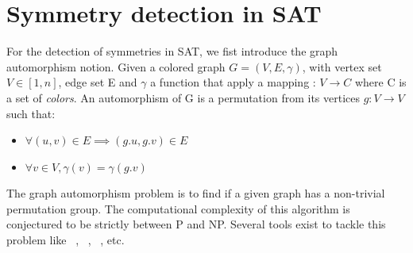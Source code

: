%
%
%
\section{Symmetry detection in SAT}
For the detection of symmetries in SAT, we fist introduce the graph automorphism notion.
Given a colored graph $G = (V, E, \gamma)$, with vertex set $V \in  [1, n] $, edge set E and
$\gamma$ a function that apply a mapping : $V \rightarrow C$ where C is a set of \emph{colors}.
An automorphism of G is a permutation from its vertices $g :V \rightarrow V$ 
such that:
\begin{itemize}
 \item $\forall (u, v) \in E \implies (g.u, g.v) \in E$
 \item $\forall v \in V, \gamma(v) = \gamma(g.v)$
\end{itemize}
The graph automorphism problem is to find if a given graph has a non-trivial permutation group. 
The computational complexity of this algorithm is conjectured to be strictly between P and NP.
Several tools exist to tackle this problem like \saucy~\cite{katebi2010symmetry},
\bliss~\cite{JunttilaKaski:ALENEX2007}, \nauty~\cite{mckay2003nauty}, etc.

